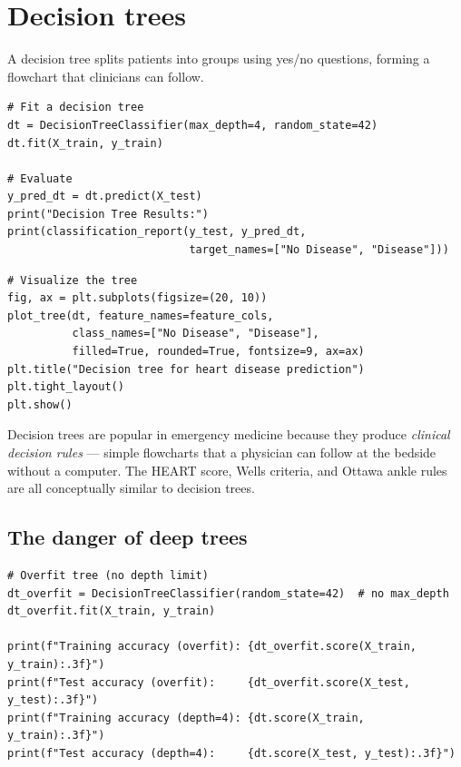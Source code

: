 \section{Decision trees}

A decision tree splits patients into groups using yes/no questions, forming a flowchart that clinicians can follow.

\begin{verbatim}
# Fit a decision tree
dt = DecisionTreeClassifier(max_depth=4, random_state=42)
dt.fit(X_train, y_train)

# Evaluate
y_pred_dt = dt.predict(X_test)
print("Decision Tree Results:")
print(classification_report(y_test, y_pred_dt,
                            target_names=["No Disease", "Disease"]))
\end{verbatim}

\begin{verbatim}
# Visualize the tree
fig, ax = plt.subplots(figsize=(20, 10))
plot_tree(dt, feature_names=feature_cols,
          class_names=["No Disease", "Disease"],
          filled=True, rounded=True, fontsize=9, ax=ax)
plt.title("Decision tree for heart disease prediction")
plt.tight_layout()
plt.show()
\end{verbatim}

\begin{clinicalnote}
Decision trees are popular in emergency medicine because they produce \emph{clinical decision rules} --- simple flowcharts that a physician can follow at the bedside without a computer. The HEART score, Wells criteria, and Ottawa ankle rules are all conceptually similar to decision trees.
\end{clinicalnote}

\subsection{The danger of deep trees}

\begin{verbatim}
# Overfit tree (no depth limit)
dt_overfit = DecisionTreeClassifier(random_state=42)  # no max_depth
dt_overfit.fit(X_train, y_train)

print(f"Training accuracy (overfit): {dt_overfit.score(X_train, y_train):.3f}")
print(f"Test accuracy (overfit):     {dt_overfit.score(X_test, y_test):.3f}")
print(f"Training accuracy (depth=4): {dt.score(X_train, y_train):.3f}")
print(f"Test accuracy (depth=4):     {dt.score(X_test, y_test):.3f}")
\end{verbatim}

